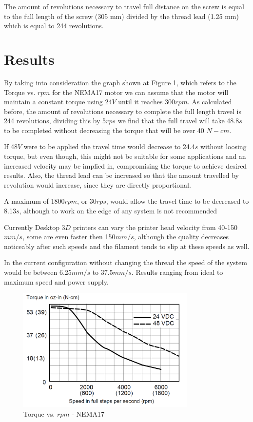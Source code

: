 \documentclass[transmag]{IEEEtran}
\begin{document}
The amount of revolutions necessary to travel full distance on the screw is equal to the full length of the screw (305 mm) divided by the thread lead (1.25 mm) which is equal to 244 revolutions.



\section{Results}


By taking into consideration the graph shown at Figure \ref{ASS4-RPM-Nema}, which refers to the Torque vs. $rpm$ for the NEMA17 motor we can assume that the motor will maintain a constant torque using 24$V$ until it reaches 300$rpm$. As calculated before, the amount of revolutions necessary to complete the full length travel is 244 revolutions, dividing this by 5$rps$ we find that the full travel will take 48.8$s$ to be completed without decreasing the torque that will be over 40 $N-cm$. \cite{ref5}

If 48$V$ were to be applied the travel time would decrease to 24.4$s$ without loosing torque, but even though, this might not be suitable for some applications and an increased velocity may be implied in, compromising the torque to achieve desired results. Also, the thread lead can be increased so that the amount travelled by revolution would increase, since they are directly proportional.

A maximum of 1800$rpm$, or 30$rps$, would allow the travel time to be decreased to 8.13$s$, although to work on the edge of any system is not recommended 


Currently Desktop $3D$ printers can vary the printer head velocity from 40-150$mm/s$, some are even faster then 150$mm/s$, although the quality decreases noticeably after such speeds and the filament tends to slip at these speeds as well. \cite{ref6}

In the current configuration without changing the thread the speed of the system would be between 6.25$mm/s$ to 37.5$mm/s$. Results ranging from ideal to maximum speed and power supply. 


\begin{figure}[H]
\centerline{\includegraphics[width=3.5in]{./images/ASS4-RPM-Nema}}
\caption{Torque vs. $rpm$ - NEMA17 \cite{ref5}\label{ASS4-RPM-Nema}}
\end{figure}
\end{document}
